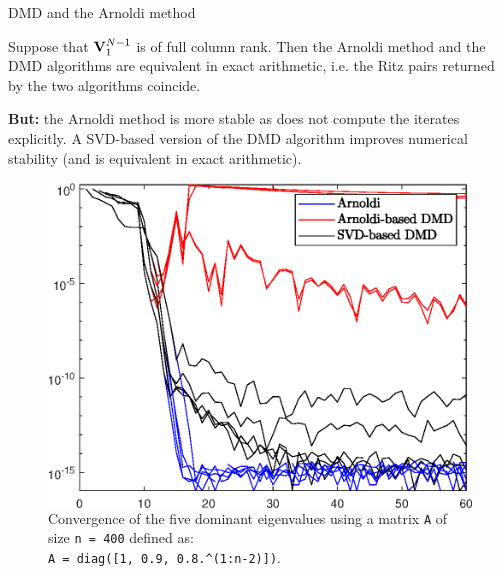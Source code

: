 \documentclass{beamer}
\begin{document}
\begin{frame}{DMD and the Arnoldi method}
\begin{prop}
Suppose that $\vb{V}_1^{N-1}$ is of full column rank. Then the Arnoldi method and the DMD algorithms are equivalent in exact arithmetic, i.e. the Ritz pairs returned by the two algorithms coincide. 
\end{prop}
\alert{\textbf{But:}} the Arnoldi method is more stable as does not compute the iterates explicitly. A SVD-based version of the DMD algorithm improves numerical stability (and is equivalent in exact arithmetic).
\begin{figure}[h]
    \begin{columns}
        \includegraphics[width=\linewidth]{../code/figures/Arnoldi_vs_DMD.eps}
        \caption{Convergence of the five dominant eigenvalues using a matrix \texttt{A} of size \texttt{n = 400} defined as:\\ \texttt{A = diag([1, 0.9, 0.8.\^{}(1:n-2)])}.}
      \end{columns}
\end{figure}
\end{frame}
\end{document}
